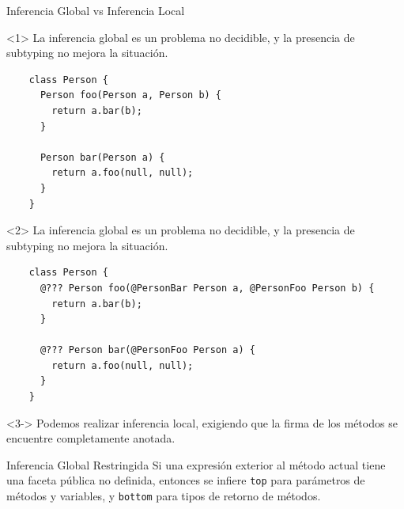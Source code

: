 \documentclass[aspectratio=169,10pt]{beamer}
\begin{document}
\begin{frame}[fragile]{Inferencia Global vs Inferencia Local}

  \begin{onlyenv}<1>
		\only<2-|handout:0>{\stepcounter{framenumber}}
    La inferencia global es un problema no decidible, y la presencia de subtyping no mejora la situación.
    \begin{lstlisting}
    class Person {
      Person foo(Person a, Person b) {
        return a.bar(b);
      }

      Person bar(Person a) {
        return a.foo(null, null);
      }
    }
    \end{lstlisting}
  \end{onlyenv}
  \begin{onlyenv}<2>
    La inferencia global es un problema no decidible, y la presencia de subtyping no mejora la situación.
    \begin{lstlisting}
    class Person {
      @??? Person foo(@PersonBar Person a, @PersonFoo Person b) {
        return a.bar(b);
      }

      @??? Person bar(@PersonFoo Person a) {
        return a.foo(null, null);
      }
    }
    \end{lstlisting}
  \end{onlyenv}

  \begin{onlyenv}<3->
    Podemos realizar inferencia local, exigiendo que la firma de los métodos se encuentre completamente anotada.
  \end{onlyenv}

\end{frame}

\begin{frame}[fragile]{Inferencia Global Restringida}
  Si una expresión exterior al método actual tiene una faceta pública no definida, entonces se infiere \texttt{top} para parámetros de métodos y variables, y \texttt{bottom} para tipos de retorno de métodos.

  \begin{itemize}
  \end{itemize}

\end{frame}
\end{document}
